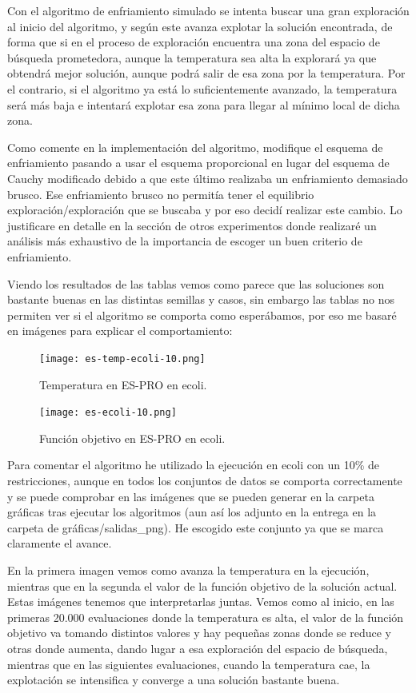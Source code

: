 \documentclass[12pt, spanish]{article}
\begin{document}
Con el algoritmo de enfriamiento simulado se intenta buscar una gran exploración al inicio del algoritmo, y según este avanza explotar la solución encontrada, de forma que si en el proceso de exploración encuentra una zona del espacio de búsqueda prometedora, aunque la temperatura sea alta la explorará ya que obtendrá mejor solución, aunque podrá salir de esa zona por la temperatura. Por el contrario, si el algoritmo ya está lo suficientemente avanzado, la temperatura será más baja e intentará explotar esa zona para llegar al mínimo local de dicha zona.

Como comente en la implementación del algoritmo, modifique el esquema de enfriamiento pasando a usar el esquema proporcional en lugar del esquema de Cauchy modificado debido a que este último realizaba un enfriamiento demasiado brusco. Ese enfriamiento brusco no permitía tener el equilibrio exploración/exploración que se buscaba y por eso decidí realizar este cambio. Lo justificare en detalle en la sección de otros experimentos donde realizaré un análisis más exhaustivo de la importancia de escoger un buen criterio de enfriamiento.

Viendo los resultados de las tablas vemos como parece que las soluciones son bastante buenas en las distintas semillas y casos, sin embargo las tablas no nos permiten ver si el algoritmo se comporta como esperábamos, por eso me basaré en imágenes para explicar el comportamiento:

\begin{figure}[H]
	\centering
	\texttt{[image: es-temp-ecoli-10.png]}
	
	\caption{Temperatura en ES-PRO en ecoli.}
	\label{fig:es-cmp2}
\end{figure}

\begin{figure}[H]
	\centering
	\texttt{[image: es-ecoli-10.png]}
	
	\caption{Función objetivo en ES-PRO en ecoli.}
	\label{fig:es-cmp1}
\end{figure}


Para comentar el algoritmo he utilizado la ejecución en ecoli con un 10\% de restricciones, aunque en todos los conjuntos de datos se comporta correctamente y se puede comprobar en las imágenes que se pueden generar en la carpeta gráficas tras ejecutar los algoritmos (aun así los adjunto en la entrega en la carpeta de gráficas/salidas\_png). He escogido este conjunto ya que se marca claramente el avance.

En la primera imagen vemos como avanza la temperatura en la ejecución, mientras que en la segunda el valor de la función objetivo de la solución actual. Estas imágenes tenemos que interpretarlas juntas. Vemos como al inicio, en las primeras 20.000 evaluaciones donde la temperatura es alta, el valor de la función objetivo va tomando distintos valores y hay pequeñas zonas donde se reduce y otras donde aumenta, dando lugar a esa exploración del espacio de búsqueda, mientras que en las siguientes evaluaciones, cuando la temperatura cae, la explotación se intensifica y converge a una solución bastante buena.
\end{document}
